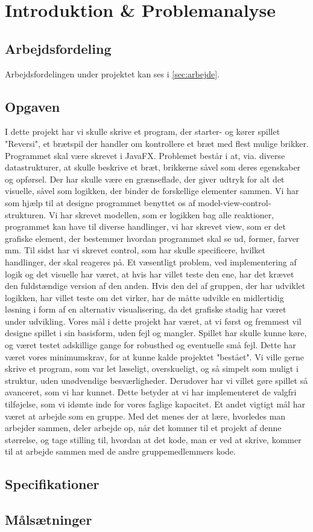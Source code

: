 \section{Introduktion \& Problemanalyse}
\subsection{Arbejdsfordeling}
Arbejdsfordelingen under projektet kan ses i \cref{sec:arbejde}.
\subsection{Opgaven}
I dette projekt har vi skulle skrive et program, der starter- og kører spillet "Reversi", et brætspil der handler om kontrollere et bræt med flest mulige brikker. Programmet skal være skrevet i JavaFX. Problemet består i at, via. diverse datastrukturer, at skulle beskrive et bræt, brikkerne såvel som deres egenskaber og opførsel. Der har skulle være en grænseflade, der giver udtryk for alt det visuelle, såvel som logikken, der binder de forskellige elementer sammen. 
Vi har som hjælp til at designe programmet benyttet os af model-view-control-strukturen. Vi har skrevet modellen, som er logikken bag alle reaktioner, programmet kan have til diverse handlinger, vi har skrevet view, som er det grafiske element, der bestemmer hvordan programmet skal se ud, former, farver mm. Til sidst har vi skrevet control, som har skulle specificere, hvilket handlinger, der skal reageres på. \newline
\newline
Et væsentligt problem, ved implementering af logik og det visuelle har været, at hvis har villet teste den ene, har det krævet den fuldstændige version af den anden. Hvis den del af gruppen, der har udviklet logikken, har villet teste om det virker, har de måtte udvikle en midlertidig løsning i form af en alternativ visualisering, da det grafiske stadig har været under udvikling.
\newline
\newline
Vores mål i dette projekt har været, at vi først og fremmest vil designe spillet i sin basisform, uden fejl og mangler. Spillet har skulle kunne køre, og været testet adskillige gange for robusthed og eventuelle små fejl. Dette har været vores minimumskrav, for at kunne kalde projektet "bestået".
Vi ville gerne skrive et program, som var let læseligt, overskueligt, og så simpelt som muligt i struktur, uden unødvendige besværligheder.
Derudover har vi villet gøre spillet så avanceret, som vi har kunnet. Dette betyder at vi har implementeret de valgfri tilføjelse, som vi idømte inde for vores faglige kapacitet. 
Et andet vigtigt mål har været at arbejde som en gruppe. Med det menes der at lære, hvorledes man arbejder sammen, deler arbejde op, når det kommer til et projekt af denne størrelse, og tage stilling til, hvordan at det kode, man er ved at skrive, kommer til at arbejde sammen med de andre gruppemedlemmers kode. 




\subsection{Specifikationer}
\subsection{Målsætninger}